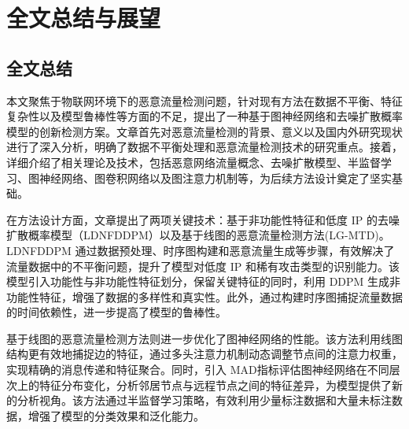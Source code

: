 \documentclass[promaster]{thesis-uestc}
\begin{document}




\chapter{全文总结与展望}

\section{全文总结}

本文聚焦于物联网环境下的恶意流量检测问题，针对现有方法在数据不平衡、特征复杂性以及模型鲁棒性等方面的不足，提出了一种基于图神经网络和去噪扩散概率模型的创新检测方案。文章首先对恶意流量检测的背景、意义以及国内外研究现状进行了深入分析，明确了数据不平衡处理和恶意流量检测技术的研究重点。接着，详细介绍了相关理论及技术，包括恶意网络流量概念、去噪扩散模型、半监督学习、图神经网络、图卷积网络以及图注意力机制等，为后续方法设计奠定了坚实基础。

在方法设计方面，文章提出了两项关键技术：基于非功能性特征和低度 IP 的去噪扩散概率模型（LDNFDDPM）以及基于线图的恶意流量检测方法(LG-MTD)。LDNFDDPM 通过数据预处理、时序图构建和恶意流量生成等步骤，有效解决了流量数据中的不平衡问题，提升了模型对低度 IP 和稀有攻击类型的识别能力。该模型引入功能性与非功能性特征划分，保留关键特征的同时，利用 DDPM 生成非功能性特征，增强了数据的多样性和真实性。此外，通过构建时序图捕捉流量数据的时间依赖性，进一步提高了模型的鲁棒性。

基于线图的恶意流量检测方法则进一步优化了图神经网络的性能。该方法利用线图结构更有效地捕捉边的特征，通过多头注意力机制动态调整节点间的注意力权重，实现精确的消息传递和特征聚合。同时，引入 MAD指标评估图神经网络在不同层次上的特征分布变化，分析邻居节点与远程节点之间的特征差异，为模型提供了新的分析视角。该方法通过半监督学习策略，有效利用少量标注数据和大量未标注数据，增强了模型的分类效果和泛化能力。
\end{document}
